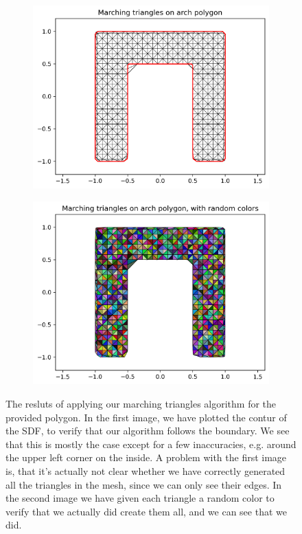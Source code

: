 \documentclass[acmtog]{acmart}
\begin{document}
\begin{figure}[H]
  \centering
  \begin{subfigure}{0.3\textwidth}
    \centering
    \includegraphics[width=\textwidth]{Images/marching_triangles_arch.png}
  \end{subfigure}
  \begin{subfigure}{0.3\textwidth}
    \includegraphics[width=\textwidth]{Images/marching_triangles_arch_colors.png}
    \centering
  \end{subfigure}\hfill
  \caption{The resluts of applying our marching triangles algorithm for the provided polygon. In the first image, we have plotted the contur of the SDF, to verify that our algorithm follows the boundary. We see that this is mostly the case except for a few inaccuracies, e.g. around the upper left corner on the inside. A problem with the first image is, that it's actually not clear whether we have correctly generated all the triangles in the mesh, since we can only see their edges. In the second image we have given each triangle a random color to verify that we actually did create them all, and we can see that we did.}
\end{figure}
\end{document}
